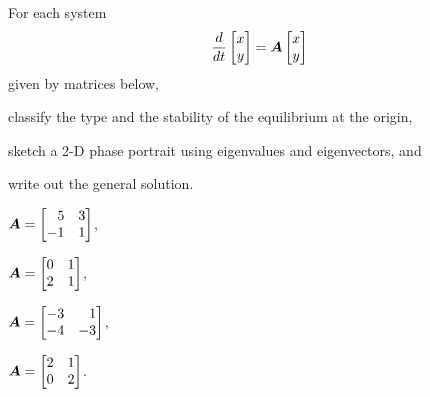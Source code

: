       \begin{question}
      For each system
      \begin{equation*}
        \frac{d}{dt}
        \begin{bmatrix}
          x \\ y
        \end{bmatrix}
      = \bm{A}   \begin{bmatrix}
          x \\ y
        \end{bmatrix}
      \end{equation*}
      given by matrices below,
      \begin{compactitem}
      \item classify the type and the stability of the equilibrium at the origin,
      \item sketch a 2-D phase portrait using eigenvalues and eigenvectors, and
      \item write out the general solution.
      \end{compactitem}

      \begin{fullwidth}
      \begin{colenumerate}[4]
      \item \(\mm{A}=
        \begin{bmatrix*}[r]
          5 & 3 \\ -1 & 1
        \end{bmatrix*}\), %
      \item \(\mm{A}=
        \begin{bmatrix*}[r]
            0 & 1 \\ 2 & 1
          \end{bmatrix*}\), %
      \item \(\mm{A}=
        \begin{bmatrix*}[r]
            -3 & 1 \\ -4 & -3
          \end{bmatrix*}\), %
      \item \(\mm{A}=
        \begin{bmatrix*}[r]
            2 & 1 \\ 0 & 2
          \end{bmatrix*}\). %
      \end{colenumerate}
      \end{fullwidth}
      \end{question}

